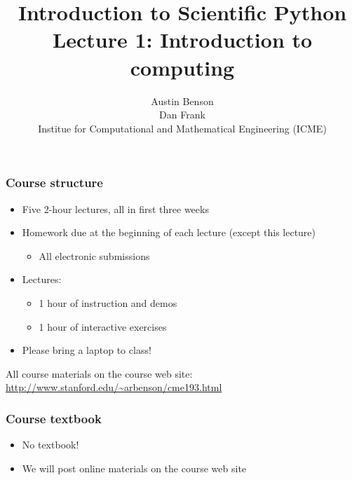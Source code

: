 \documentclass{beamer}
\title{Introduction to Scientific Python \\
Lecture 1: Introduction to computing}
\author{Austin Benson \\
\vspace{0.1in}
Dan Frank \\
\vspace{0.1in}
Institue for Computational and Mathematical Engineering (ICME)}
\begin{document}
\maketitle

\begin{frame}
\frametitle{Course structure}

\begin{itemize}
\setlength{\itemsep}{0.2in}
\item{
Five 2-hour lectures, all in first three weeks
}

\item{
Homework due at the beginning of each lecture (except this lecture)
\begin{itemize}
\setlength{\itemsep}{0.05in}
\item{All electronic submissions}
\end{itemize}
}

\item{
Lectures:
\begin{itemize}
\setlength{\itemsep}{0.05in}
\item{1 hour of instruction and demos}
\item{1 hour of interactive exercises}
\end{itemize}
}

\item{
Please bring a laptop to class!
}
\end{itemize}

\vspace{0.2in}

All course materials on the course web site: \url{http://www.stanford.edu/~arbenson/cme193.html}

\end{frame}

\begin{frame}
\frametitle{Course textbook}

\begin{itemize}
\setlength{\itemsep}{0.2in}
\item{No textbook!}
\item{We will post online materials on the course web site}
\end{itemize}

\end{frame}
\end{document}
